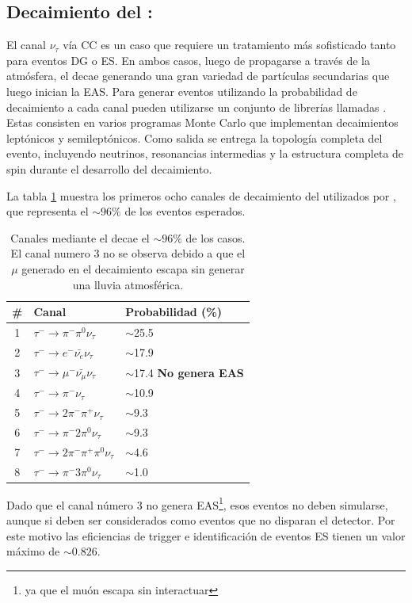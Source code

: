 	
	\subsection{Decaimiento del \tauon{}: \tauola{}}
	
	El canal $\nu_{\tau}$ vía CC es un caso que requiere un tratamiento más sofisticado tanto para eventos DG o ES.
	En ambos casos, luego de propagarse a trav\'es de la atm\'osfera, el \tauon{} decae generando una gran variedad de part\'iculas secundarias que luego inician la EAS.
	Para generar eventos utilizando la probabilidad de decaimiento a cada canal pueden utilizarse un conjunto de librer\'ias llamadas \tauola{}.
	Estas consisten en varios programas Monte Carlo que implementan decaimientos lept\'onicos y semilept\'onicos.
	Como salida se entrega la topolog\'ia completa del evento, incluyendo neutrinos, resonancias intermedias y la estructura completa de spin durante el desarrollo del decaimiento.
	
	La tabla \ref{tab:tauDecay} muestra los primeros ocho canales de decaimiento del \tauon{} utilizados por \tauola{}, que representa el $\sim96\%$ de los eventos esperados.
	\begin{table}[h]
		\begin{center}
		\begin{tabular}{|c|l|l|}
		\hline
		\# &Canal   & Probabilidad (\%) \\
		\hline
		1&$\tau^{-}\rightarrow \pi^{-}\pi^{0}\nu_{\tau}$   & $\sim$25.5 \\
		2&$\tau^{-}\rightarrow e^{-}\bar{\nu_{e}}\nu_{\tau}$   & $\sim$17.9 \\
		3&$\tau^{-}\rightarrow \mu^{-}\bar{\nu_{\mu}}\nu_{\tau}$   & $\sim$17.4 {\bf No genera EAS}\\
		4&$\tau^{-}\rightarrow \pi^{-}\nu_{\tau}$   & $\sim$10.9 \\
		5&$\tau^{-}\rightarrow 2\pi^{-}\pi^{+}\nu_{\tau}$   & $\sim$9.3 \\
		6&$\tau^{-}\rightarrow \pi^{-}2\pi^{0}\nu_{\tau}$   & $\sim$9.3 \\
		7&$\tau^{-}\rightarrow 2\pi^{-}\pi^{+}\pi^{0}\nu_{\tau}$   & $\sim$4.6 \\
		8&$\tau^{-}\rightarrow \pi^{-}3\pi^{0}\nu_{\tau}$   & $\sim$1.0 \\
		\hline
		\end{tabular}
		\end{center}
		\caption{\label{tab:tauDecay}
		Canales mediante el \tauon{} decae el $\sim96\%$ de los casos. El canal numero 3 no se observa debido a que el $\mu$ generado en el decaimiento escapa sin generar una lluvia atmosférica.
		}
	\end{table}
	Dado que el canal número 3 no genera EAS\footnote{ya que el muón escapa sin interactuar}, esos eventos no deben simularse, aunque si deben ser considerados como eventos que no disparan el detector.
	Por este motivo las eficiencias de trigger e identificación de eventos ES tienen un valor máximo de $\sim0.826$.
	
